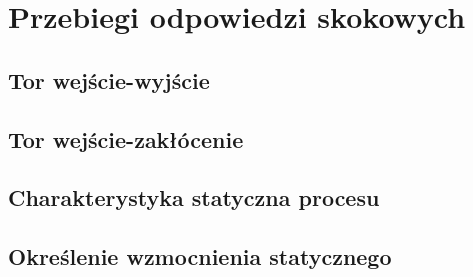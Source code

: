 \chapter{Przebiegi odpowiedzi skokowych}

\section{Tor wejście-wyjście}

\section{Tor wejście-zakłócenie}

\section{Charakterystyka statyczna procesu}

\section{Określenie wzmocnienia statycznego}